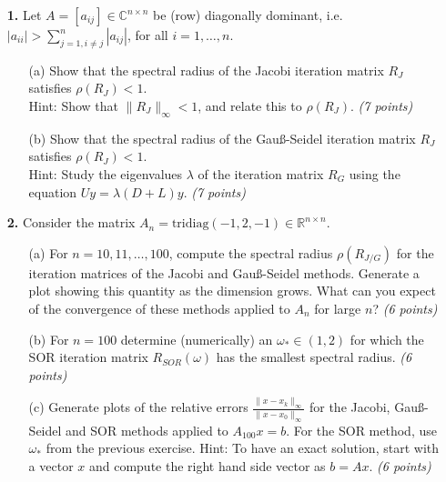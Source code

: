 \documentclass[10pt]{report}
\begin{document}
\begin{enumerate}
    
  \item[\textbf{1.}] Let $A=[a_{ij}]\in\mathbb{C}^{n\times n}$ be (row) diagonally dominant, i.e. $|a_{ii}|>\sum_{j=1,i\neq j}^n|a_{ij}|$, for all $i=1,\ldots,n$.
  \begin{enumerate}
    \item[(a)] Show that the spectral radius of the Jacobi iteration matrix $R_J$ satisfies  $\rho(R_J) <1$.\\
    Hint: Show that $\|R_J\|_{\infty}<1$, and relate this to $\rho(R_J)$. \textit{(7 points)}

    \item[(b)] Show that the spectral radius of the Gau\ss-Seidel iteration matrix $R_J$ satisfies $\rho(R_J) <1$.\\
Hint: Study the eigenvalues $\lambda$ of the iteration matrix
      $R_G$ using the equation $Uy=\lambda(D+L)y$. \linebreak 
\textit{(7 points)}
\end{enumerate}

\vspace{0.1cm} 

\item[\textbf{2.}] Consider the matrix $A_n=\text{tridiag}(-1,2,-1)\in\mathbb{R}^{n\times n}$.
  \begin{enumerate}
    \item[(a)] For  $n=10,11,\ldots,100$, compute the spectral radius $\rho(R_{J/G})$ for the iteration matrices of the Jacobi and Gau\ss-Seidel methods. Generate a plot showing this quantity as the dimension grows. What can you expect of the convergence  of these methods applied to $A_n$ for large $n$? \textit{(6 points)}

    \item[(b)] For $n=100$ determine (numerically) an $\omega_*\in(1,2)$ for which the SOR iteration matrix $R_{SOR}(\omega)$ has the smallest spectral radius. \textit{(6 points)}


    \item[(c)] Generate plots of the relative errors $\frac{\|x-x_k\|_{\infty}}{\|x-x_0\|_{\infty}}$ for the Jacobi, Gau\ss-Seidel and SOR methods applied to $A_{100}x=b$. For the SOR method, use $\omega_*$ from the previous exercise. Hint: To have an exact solution, start with a vector $x$ and compute the right hand side vector as $b=Ax$.  \textit{(6 points)} 

\vspace{0.1cm} 


\end{enumerate}
\end{enumerate}
\end{document}
